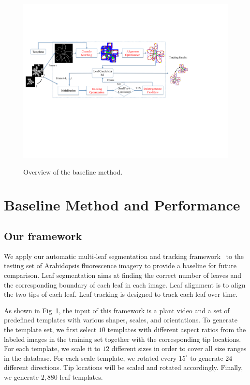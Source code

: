 \begin{figure}[t!]
\centering
\includegraphics[width=.98\textwidth]{Figures/overview}\\
\caption{Overview of the baseline method.}
\label{fig:methodOverview}
\end{figure}

\section{Baseline Method and Performance}
\label{sec:baseline}
\subsection{Our framework}
We apply our automatic multi-leaf segmentation and tracking framework~\cite{yin2014a,yin2014b} to the testing set of Arabidopsis fluorescence imagery to provide a baseline for future comparison.
Leaf segmentation aims at finding the correct number of leaves and the corresponding boundary of each leaf in each image.
Leaf alignment is to align the two tips of each leaf.
Leaf tracking is designed to track each leaf over time.




As shown in Fig~\ref{fig:methodOverview}, the input of this framework is a plant video and a set of predefined templates with various shapes, scales, and orientations.
To generate the template set, we first select $10$ templates with different aspect ratios from the labeled images in the training set together with the corresponding tip locations.
For each template, we scale it to $12$ different sizes in order to cover all size ranges in the database.
For each scale template, we rotated every $15^{\circ}$ to generate $24$ different directions.
Tip locations will be scaled and rotated accordingly.
Finally, we generate $2,880$ leaf templates.


